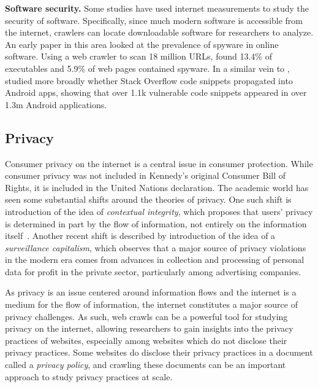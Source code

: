 \textbf{Software security.}
Some studies have used internet measurements to study the security of software. Specifically, since much modern software is accessible from the internet, crawlers can locate downloadable software for researchers to analyze. An early paper in this area looked at the prevalence of spyware in online software. Using a web crawler to scan 18 million URLs, \citet{moshchuk2006crawler} found 13.4\% of executables and 5.9\% of web pages contained spyware. In a similar vein to \citet{kharche2021study}, \citet{fischer2017stack} studied more broadly whether Stack Overflow code snippets propagated into Android apps, showing that over 1.1k vulnerable code snippets appeared in over 1.3m Android applications. 


\subsection{Privacy}
Consumer privacy on the internet is a central issue in consumer protection. While consumer privacy was not included in Kennedy's original Consumer Bill of Rights, it is included in the United Nations declaration. The academic world has seen some substantial shifts around the theories of privacy. One such shift is \cites{nissenbaum2004privacy} introduction of the idea of \textit{contextual integrity}, which proposes that users' privacy is determined in part by the flow of information, not entirely on the information itself~\cite{nissenbaum2009privacy}. Another recent shift is described by \cites{zuboff2014digital} introduction of the idea of a \textit{surveillance capitalism}, which observes that a major source of privacy violations in the modern era comes from advances in collection and processing of personal data for profit in the private sector, particularly among advertising companies.

As privacy is an issue centered around information flows and the internet is a medium for the flow of information, the internet constitutes a major source of privacy challenges. As such, web crawls can be a powerful tool for studying privacy on the internet, allowing researchers to gain insights into the privacy practices of websites, especially among websites which do not disclose their privacy practices. Some websites do disclose their privacy practices in a document called a \textit{privacy policy}, and crawling these documents can be an important approach to study privacy practices at scale. 

